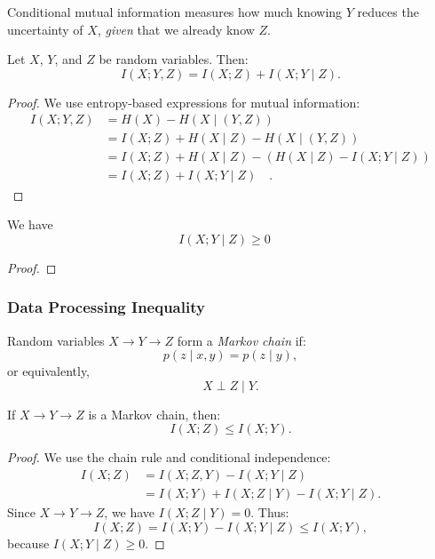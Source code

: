 \documentclass[../../main.tex]{subfiles}
\begin{document}
\begin{remark}
    Conditional mutual information measures how much knowing \( Y \) reduces the uncertainty of \( X \), \emph{given} that we already know \( Z \).
\end{remark}

\begin{proposition}
    Let \( X \), \( Y \), and \( Z \) be random variables. Then:
    \[
        I(X; Y, Z) = I(X; Z) + I(X; Y \mid Z).
    \]
\end{proposition}
\begin{proof}
    We use entropy-based expressions for mutual information:
    \begin{align*}
        I(X; Y, Z) &= H(X) - H(X \mid (Y, Z)) \\
        &= I(X; Z) + H(X \mid Z) - H(X \mid (Y, Z)) \\
        &= I(X; Z) + H(X \mid Z) - (H(X \mid Z) - I(X; Y \mid Z)) \\
        &= I(X; Z) + I(X; Y \mid Z) \quad .
    \end{align*}
\end{proof}

\begin{proposition}
    We have
    \[
        I(X; Y \mid Z) \geq 0 \quad
    \]
\end{proposition}
\begin{proof}
    
\end{proof}

\subsubsection{Data Processing Inequality}

\begin{definition}
Random variables \( X \to Y \to Z \) form a \emph{Markov chain} if:
\[
p(z \mid x, y) = p(z \mid y),
\]
or equivalently,
\[
X \perp Z \mid Y.
\]
\end{definition}

\begin{theorem}
If \( X \to Y \to Z \) is a Markov chain, then:
\[
I(X; Z) \leq I(X; Y).
\]
\end{theorem}

\begin{proof}
We use the chain rule and conditional independence:
\[
\begin{aligned}
I(X; Z) &= I(X; Z, Y) - I(X; Y \mid Z) \\
       &= I(X; Y) + I(X; Z \mid Y) - I(X; Y \mid Z).
\end{aligned}
\]
Since \( X \to Y \to Z \), we have \( I(X; Z \mid Y) = 0 \). Thus:
\[
I(X; Z) = I(X; Y) - I(X; Y \mid Z) \leq I(X; Y),
\]
because \( I(X; Y \mid Z) \geq 0 \).
\end{proof}
\end{document}
